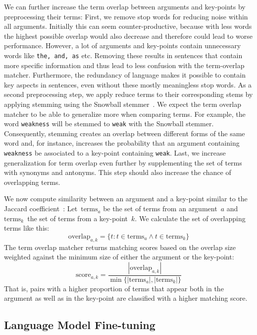 We can further increase the term overlap between arguments and key-points by preprocessing their terms:
First, we remove stop words for reducing noise within all arguments.
Initially this can seem counter-productive, because with less words the highest possible overlap would also decrease and therefore could lead to worse performance.
However, a lot of arguments and key-points contain unnecessary words like \texttt{the, and, as} etc.
Removing these results in sentences that contain more specific information and thus lead to less confusion with the term-overlap matcher.
Furthermore, the redundancy of language makes it possible to contain key aspects in sentences, even without these mostly meaningless stop words.
As a second preprocessing step, we apply reduce terms to their corresponding stems by applying stemming using the Snowball stemmer~\todocite. 
We expect the term overlap matcher to be able to generalize more when comparing terms.
For example, the word \texttt{weakness} will be stemmed to \texttt{weak} with the Snowball stemmer. 
Consequently, stemming creates an overlap between different forms of the same word and, for instance, increases the probability that an argument containing \texttt{weakness} be associated to a key-point containing \texttt{weak}.
Last, we increase generalization for term overlap even further by supplementing the set of terms with synonyms and antonyms. This step should also increase the chance of overlapping terms.

We now compute similarity between an argument and a key-point similar to the Jaccard coefficient~\cite{Jaccard1902}:
Let~\(\text{terms}_a\) be the set of terms from an argument~\(a\) and \(\text{terms}_k\)~the set of terms from a key-point~\(k\).
We calculate the set of overlapping terms like this:
\begin{equation}
    \text{overlap}_{a,k} = \{ t : t \in \text{terms}_a \land t \in \text{terms}_k \}
\end{equation}
The term overlap matcher returns matching scores based on the overlap size weighted against the minimum size of either the argument or the key-point:
\begin{equation}
    \text{score}_{a,k} = \frac{ |\text{overlap}_{a,k}| }{ \min\{ |\text{terms}_a|, |\text{terms}_k| \} }
\end{equation}
That is, pairs with a higher proportion of terms that appear both in the argument as well as in the key-point are classified with a higher matching score.

\subsection{Language Model Fine-tuning}

